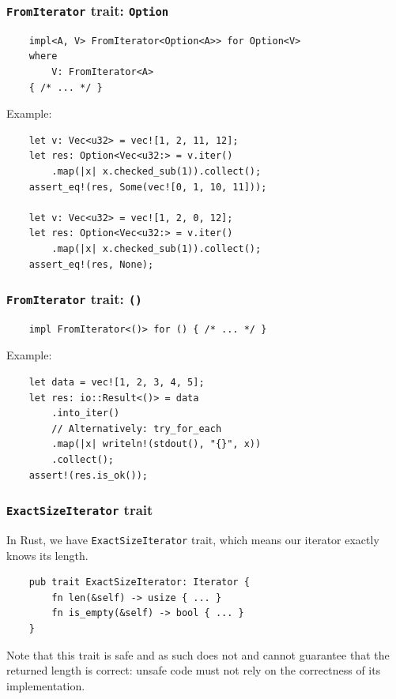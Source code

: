\documentclass[aspectratio=1610,t]{beamer}
\begin{document}

\begin{frame}[fragile]
\frametitle{\texttt{FromIterator} trait: \texttt{Option}}
\begin{verbatim}
    impl<A, V> FromIterator<Option<A>> for Option<V>
    where
        V: FromIterator<A>
    { /* ... */ }
\end{verbatim}

Example:

\begin{verbatim}
    let v: Vec<u32> = vec![1, 2, 11, 12];
    let res: Option<Vec<u32:> = v.iter()
        .map(|x| x.checked_sub(1)).collect();
    assert_eq!(res, Some(vec![0, 1, 10, 11]));

    let v: Vec<u32> = vec![1, 2, 0, 12];
    let res: Option<Vec<u32:> = v.iter()
        .map(|x| x.checked_sub(1)).collect();
    assert_eq!(res, None);
\end{verbatim}
\end{frame}


\begin{frame}[fragile]
\frametitle{\texttt{FromIterator} trait: \texttt{()}}
\begin{verbatim}
    impl FromIterator<()> for () { /* ... */ }
\end{verbatim}

Example:

\begin{verbatim}
    let data = vec![1, 2, 3, 4, 5];
    let res: io::Result<()> = data
        .into_iter()
        // Alternatively: try_for_each
        .map(|x| writeln!(stdout(), "{}", x))
        .collect();
    assert!(res.is_ok());
\end{verbatim}
\end{frame}


\begin{frame}[fragile]
\frametitle{\texttt{ExactSizeIterator} trait}
In Rust, we have \texttt{ExactSizeIterator} trait, which means our iterator exactly knows its length.

\begin{verbatim}
    pub trait ExactSizeIterator: Iterator {
        fn len(&self) -> usize { ... }
        fn is_empty(&self) -> bool { ... }
    }
\end{verbatim}

Note that this trait is safe and as such does not and cannot guarantee that the returned length is correct: unsafe code must not rely on the correctness of its implementation.
\end{frame}
\end{document}
